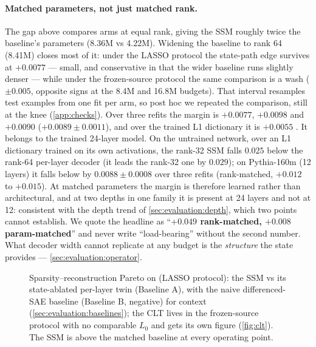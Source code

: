 \paragraph{Matched parameters, not just matched rank.}
The gap above compares arms at equal rank, giving the SSM roughly twice the
baseline's parameters (8.36M vs 4.22M). Widening the baseline to rank 64
(8.41M) closes most of it: under the LASSO protocol the state-path edge
survives at \textbf{$+0.0077$ } --- small, and
conservative in that the wider baseline runs slightly denser --- while under
the frozen-source protocol the same comparison is a wash ($\pm 0.005$,
opposite signs at the 8.4M and 16.8M budgets). That interval resamples test
examples from one fit per arm, so post hoc we repeated the comparison, still
at the knee (\cref{app:checks}). Over three refits the margin is $+0.0077$,
$+0.0098$ and $+0.0090$ ($+0.0089 \pm 0.0011$), and over the trained L1
dictionary it is $+0.0055$ . It belongs to the
trained 24-layer model. On the untrained network, over an L1 dictionary
trained on its own activations, the rank-32 SSM falls $0.025$ below the
rank-64 per-layer decoder (it leads the rank-32 one by $0.029$); on
Pythia-160m (12 layers) it falls below by $0.0088 \pm 0.0008$ over three
refits (rank-matched, $+0.012$ to $+0.015$). At matched parameters the margin
is therefore learned rather than architectural, and at two depths in one
family it is present at 24 layers and not at 12: consistent with the depth
trend of \cref{sec:evaluation:depth}, which two points cannot establish. We
quote the headline as ``\textbf{$+0.049$ rank-matched, $+0.008$
param-matched}'' and never write ``load-bearing'' without the second number.
What decoder width cannot replicate at any budget is the \emph{structure}
the state provides --- \cref{sec:evaluation:operator}.

\begin{figure}[t]
  \centering
  
  \caption{Sparsity--reconstruction Pareto on \pythia{} (LASSO protocol):
  the SSM vs its state-ablated per-layer twin (Baseline A), with the naive
  differenced-SAE baseline (Baseline B, negative) for context
  (\cref{sec:evaluation:baselines}); the CLT lives in the frozen-source
  protocol with no comparable $L_0$ and gets its own figure
  (\cref{fig:clt}). The SSM is above the matched baseline at every operating
  point.}
  \label{fig:pareto}
\end{figure}

